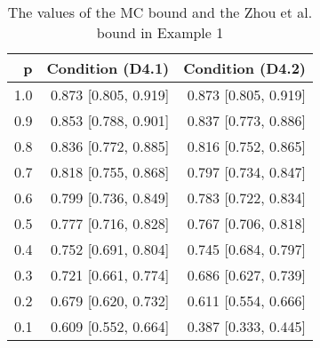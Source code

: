 \begin{table}

\caption{\label{tab:tab1}The values of the MC bound and the Zhou et al. bound in Example 1}
\centering
\begin{tabular}[t]{rrr}
\toprule
p & Condition (D4.1) & Condition (D4.2)\\
\midrule
1.0 & 0.873 [0.805, 0.919] & 0.873 [0.805, 0.919]\\
0.9 & 0.853 [0.788, 0.901] & 0.837 [0.773, 0.886]\\
0.8 & 0.836 [0.772, 0.885] & 0.816 [0.752, 0.865]\\
0.7 & 0.818 [0.755, 0.868] & 0.797 [0.734, 0.847]\\
0.6 & 0.799 [0.736, 0.849] & 0.783 [0.722, 0.834]\\
0.5 & 0.777 [0.716, 0.828] & 0.767 [0.706, 0.818]\\
0.4 & 0.752 [0.691, 0.804] & 0.745 [0.684, 0.797]\\
0.3 & 0.721 [0.661, 0.774] & 0.686 [0.627, 0.739]\\
0.2 & 0.679 [0.620, 0.732] & 0.611 [0.554, 0.666]\\
0.1 & 0.609 [0.552, 0.664] & 0.387 [0.333, 0.445]\\
\bottomrule
\end{tabular}
\end{table}
